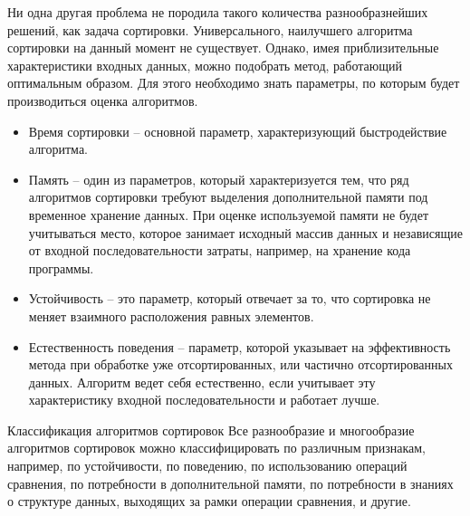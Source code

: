 \documentclass{article}
\begin{document}
\par Ни одна другая проблема не породила такого количества разнообразнейших решений, как задача сортировки. Универсального, наилучшего алгоритма сортировки на данный момент не существует. Однако, имея приблизительные характеристики входных данных, можно подобрать метод, работающий оптимальным образом. Для этого необходимо знать параметры, по которым будет производиться оценка алгоритмов.
\begin{itemize}
\item Время сортировки – основной параметр, характеризующий быстродействие алгоритма.
\item Память – один из параметров, который характеризуется тем, что ряд алгоритмов сортировки требуют выделения дополнительной памяти под временное хранение данных. При оценке используемой памяти не будет учитываться место, которое занимает исходный массив данных и независящие от входной последовательности затраты, например, на хранение кода программы.
\item Устойчивость – это параметр, который отвечает за то, что сортировка не меняет взаимного расположения равных элементов.
\item Естественность поведения – параметр, которой указывает на эффективность метода при обработке уже отсортированных, или частично отсортированных данных. Алгоритм ведет себя естественно, если учитывает эту характеристику входной последовательности и работает лучше.
\end{itemize}
Классификация алгоритмов сортировок
Все разнообразие и многообразие алгоритмов сортировок можно классифицировать по различным признакам, например, по устойчивости, по поведению, по использованию операций сравнения, по потребности в дополнительной памяти, по потребности в знаниях о структуре данных, выходящих за рамки операции сравнения, и другие.
\end{document}
